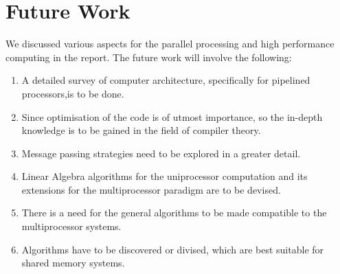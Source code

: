 \chapter{Future Work}
We discussed various aspects for the parallel processing and high performance computing in the report. The future work will involve the following:
\begin{enumerate}
\item A detailed survey of computer architecture, specifically for pipelined processors,is to be done.
\item Since optimisation of the code is of utmost importance, so the in-depth knowledge is to be gained in the field of compiler theory.
\item Message passing strategies need to be explored in a greater detail.
\item Linear Algebra algorithms for the uniprocessor computation and its extensions for the multiprocessor paradigm are to be devised.
\item There is a need for the general algorithms to be made compatible to the multiprocessor systems. 
\item Algorithms have to be discovered or divised, which are best suitable for shared memory systems.
\end{enumerate}